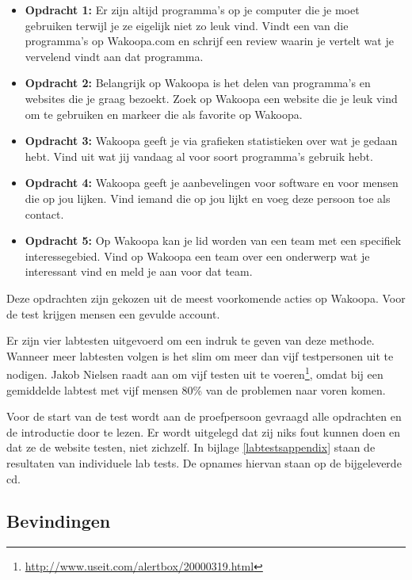 \documentclass[a4paper, 10pt, pdftex]{report}
\begin{document}
    \begin{itemize}
      \item \textbf{Opdracht 1:}
      Er zijn altijd programma's op je computer die je moet gebruiken terwijl je ze eigelijk niet zo leuk vind. Vindt een van die programma's op Wakoopa.com en schrijf een review waarin je vertelt wat je vervelend vindt aan dat programma.

      \item \textbf{Opdracht 2:}
      Belangrijk op Wakoopa is het delen van programma's en websites die je graag bezoekt. Zoek op Wakoopa een website die je leuk vind om te gebruiken en markeer die als favorite op Wakoopa.

      \item \textbf{Opdracht 3:}
      Wakoopa geeft je via grafieken statistieken over wat je gedaan hebt. Vind uit wat jij vandaag al voor soort programma's gebruik hebt.

      \item \textbf{Opdracht 4:}
      Wakoopa geeft je aanbevelingen voor software en voor mensen die op jou lijken. Vind iemand die op jou lijkt en voeg deze persoon toe als contact.

      \item \textbf{Opdracht 5:}
      Op Wakoopa kan je lid worden van een team met een specifiek interessegebied. Vind op Wakoopa een team over een onderwerp wat je interessant vind en meld je aan voor dat team.
    \end{itemize}
    Deze opdrachten zijn gekozen uit de meest voorkomende acties op Wakoopa. Voor de test krijgen mensen een gevulde account.

    Er zijn vier labtesten uitgevoerd om een indruk te geven van deze methode. Wanneer meer labtesten volgen is het slim om meer dan vijf testpersonen uit te nodigen. Jakob Nielsen raadt aan om vijf testen uit te voeren\footnote{\url{http://www.useit.com/alertbox/20000319.html}}, omdat bij een gemiddelde labtest met vijf mensen 80\% van de problemen naar voren komen.

    Voor de start van de test wordt aan de proefpersoon gevraagd alle opdrachten en de introductie door te lezen. Er wordt uitgelegd dat zij niks fout kunnen doen en dat ze de website testen, niet zichzelf. In bijlage \ref{labtestsappendix} staan de resultaten van individuele lab tests. De opnames hiervan staan op de bijgeleverde cd.

    \subsection{Bevindingen}
\end{document}
